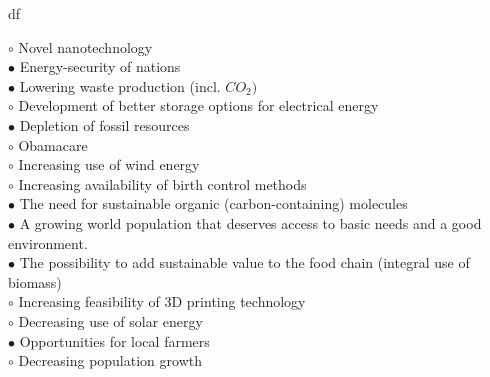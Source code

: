 df\documentclass[]{beamer}
\begin{document}
\begin{CJK}{UTF8}{gbsn}
\begin{frame}[shrink] {}
{\color{red}$\circ$} Novel nanotechnology   \\
{\color{red}$\bullet$} Energy-security of nations  \\
{\color{red}$\bullet$} Lowering waste production (incl. $CO_{2})$   \\
{\color{red}$\circ$} Development of better storage options for electrical energy  \\
{\color{red}$\bullet$} Depletion of fossil resources   \\
{\color{red}$\circ$} Obamacare  \\
{\color{red}$\circ$} Increasing use of wind energy  \\
{\color{red}$\circ$} Increasing availability of birth control methods  \\
{\color{red}$\bullet$} The need for sustainable organic (carbon-containing) molecules  \\
{\color{red}$\bullet$} A growing world population that deserves access to basic needs and a good environment.  \\
{\color{red}$\bullet$} The possibility to add sustainable value to the food chain (integral use of biomass)  \\
{\color{red}$\circ$} Increasing feasibility of 3D printing technology  \\
{\color{red}$\circ$} Decreasing use of solar energy  \\
{\color{red}$\bullet$} Opportunities for local farmers  \\
{\color{red}$\circ$} Decreasing population growth  \\
\end{frame}



\end{CJK}
\end{document}
